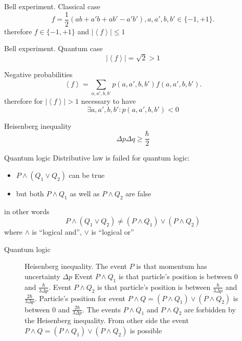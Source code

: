 \documentclass[10pt,pdf,hyperref={unicode}]{beamer}
\begin{document}
\begin{frame}{Bell experiment. Classical case}
\[
f = \frac{1}{2}\left(
a b + a' b + a b' - a' b'
\right), a,a',b,b' \in \{-1, +1\}.
\]
therefore
\(
f \in \{-1, +1\}
\)
and
\(
\left|\left<f\right>\right| \le 1
\)
\end{frame}

\begin{frame}{Bell experiment. Quantum case}
\[
\left|\left<f\right>\right| = \sqrt{2} > 1
\]
\end{frame}


\begin{frame}{Negative probabilities}
\[
\left<f\right> = \sum_{a,a',b,b'} p(a,a',b,b') f(a,a',b,b').
\]
therefore for $\left|\left<f\right>\right| > 1$ necessary to have
\[
\exists a,a',b,b': p(a,a',b,b') < 0
\]
\end{frame}

\begin{frame}{Heisenberg inequality}
  \[
  \Delta p \Delta q \ge \frac{\hbar}{2}
  \]
\end{frame}

\begin{frame}{Quantum logic}
  Distributive law is failed for quantum logic:
  \begin{itemize}
  \item $P \land (Q_1 \lor Q_2)$ can be true
  \item but both $P \land Q_1$ as well as $P \land Q_2$ are false
  \end{itemize}
  in other words
  \[
  P \land (Q_1 \lor Q_2) \ne (P \land Q_1) \lor (P \land Q_2)
  \]
  where $\land$ is ``logical and'', $\lor$ is ``logical or''
\end{frame}

\begin{frame}{Quantum logic}
\begin{figure}[H]
  \centering
  \caption{Heisenberg inequality. The event $P$ is that momentum has
    uncertainty $\Delta p$ Event $P \land Q_1$ is that particle's
    position is between $0$ and $\frac{\hbar}{3 \Delta p}$. Event
    $P \land Q_2$ is that particle's
    position is between $\frac{\hbar}{3 \Delta p}$ and
    $\frac{2\hbar}{3 \Delta p}$. Particle's position for event $P
    \land Q = (P \land Q_1)
    \lor (P \land Q_2)$ is between $0$ and $\frac{2\hbar}{3 \Delta p}$. The
    events $P \land Q_1$ and $P \land Q_2$ are forbidden by the Heisenberg
    inequality. From other side the event $P \land Q = (P \land Q_1)
    \lor (P \land Q_2)$ is possible}   
\end{figure}
\end{frame}
\end{document}
